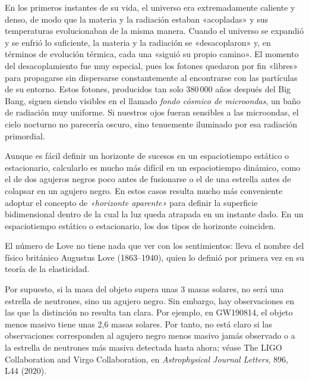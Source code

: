 \begin{description}[style=multiline,leftmargin=2em,labelwidth=1.5em]
\item[4.]\hypertarget{note:08-04}{}En los primeros instantes de su vida, el universo era extremadamente caliente y denso, de modo que la materia y la radiación estaban «acopladas» y sus temperaturas evolucionaban de la misma manera. Cuando el universo se expandió y se enfrió lo suficiente, la materia y la radiación se «desacoplaron» y, en términos de evolución térmica, cada una «siguió su propio camino». El momento del desacoplamiento fue muy especial, pues los fotones quedaron por fin «libres» para propagarse sin dispersarse constantemente al encontrarse con las partículas de su entorno. Estos fotones, producidos tan solo 380\,000 años después del Big Bang, siguen siendo visibles en el llamado \emph{fondo cósmico de microondas}, un baño de radiación muy uniforme. Si nuestros ojos fueran sensibles a las microondas, el cielo nocturno no parecería oscuro, sino tenuemente iluminado por esa radiación primordial.

\item[5.]\hypertarget{note:08-05}{}Aunque es fácil definir un horizonte de sucesos en un espaciotiempo estático o estacionario, calcularlo es mucho más difícil en un espaciotiempo dinámico, como el de dos agujeros negros poco antes de fusionarse o el de una estrella antes de colapsar en un agujero negro. En estos casos resulta mucho más conveniente adoptar el concepto de \emph{«horizonte aparente»} para definir la superficie bidimensional dentro de la cual la luz queda atrapada en un instante dado. En un espaciotiempo estático o estacionario, los dos tipos de horizonte coinciden.

\item[6.]\hypertarget{note:08-06}{}El número de Love no tiene nada que ver con los sentimientos: lleva el nombre del físico británico Augustus Love (1863--1940), quien lo definió por primera vez en su teoría de la elasticidad.

\item[7.]\hypertarget{note:08-07}{}Por supuesto, si la masa del objeto supera unas 3 masas solares, no será una estrella de neutrones, sino un agujero negro. Sin embargo, hay observaciones en las que la distinción no resulta tan clara. Por ejemplo, en GW190814, el objeto menos masivo tiene unas 2,6 masas solares. Por tanto, no está claro si las observaciones corresponden al agujero negro menos masivo jamás observado o a la estrella de neutrones más masiva detectada hasta ahora; véase The LIGO Collaboration and Virgo Collaboration, en \emph{Astrophysical Journal Letters}, 896, L44 (2020).


\end{description}
